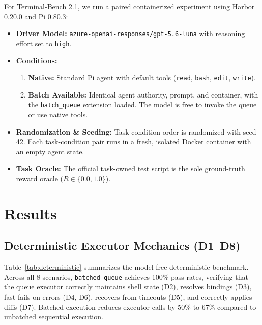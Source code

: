 \documentclass{article}
\begin{document}
For Terminal-Bench 2.1, we run a paired containerized experiment using Harbor 0.20.0 and Pi 0.80.3:
\begin{itemize}
    \item \textbf{Driver Model:} \texttt{azure-openai-responses/gpt-5.6-luna} with reasoning effort set to \texttt{high}.
    \item \textbf{Conditions:}
    \begin{enumerate}
        \item \textbf{Native:} Standard Pi agent with default tools (\texttt{read}, \texttt{bash}, \texttt{edit}, \texttt{write}).
        \item \textbf{Batch Available:} Identical agent authority, prompt, and container, with the \texttt{batch\_queue} extension loaded. The model is free to invoke the queue or use native tools.
    \end{enumerate}
    \item \textbf{Randomization \& Seeding:} Task condition order is randomized with seed 42. Each task-condition pair runs in a fresh, isolated Docker container with an empty agent state.
    \item \textbf{Task Oracle:} The official task-owned test script is the sole ground-truth reward oracle ($R \in \{0.0, 1.0\}$).
\end{itemize}

\section{Results}

\subsection{Deterministic Executor Mechanics (D1--D8)}

Table~\ref{tab:deterministic} summarizes the model-free deterministic benchmark. Across all 8 scenarios, \texttt{batched-queue} achieves 100\% pass rates, verifying that the queue executor correctly maintains shell state (D2), resolves bindings (D3), fast-fails on errors (D4, D6), recovers from timeouts (D5), and correctly applies diffs (D7). Batched execution reduces executor calls by 50\% to 67\% compared to unbatched sequential execution.
\end{document}
